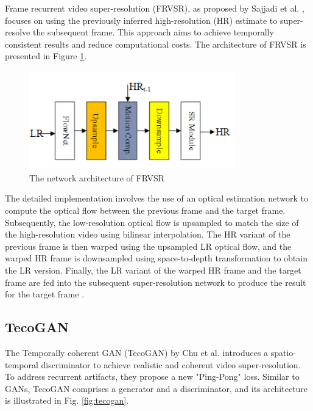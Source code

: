 \documentclass[conference]{IEEEtran}
\begin{document}
Frame recurrent video super-resolution (FRVSR), as proposed by Sajjadi et al. \cite{frvsr_2018}, focuses on using the previously inferred high-resolution (HR) estimate to super-resolve the subsequent frame. This approach aims to achieve temporally consistent results and reduce computational costs. The architecture of FRVSR is presented in Figure \ref{fig:frvsr_arch}.

\begin{figure}[t]
    \centering
    \centerline{\includegraphics[width=8.9cm]{frvsr_arch}}
    \caption{The network architecture of FRVSR \cite{video_super_resolution_survey_2020}}
    \label{fig:frvsr_arch}
\end{figure}

The detailed implementation involves the use of an optical estimation network to compute the optical flow between the previous frame and the target frame. Subsequently, the low-resolution optical flow is upsampled to match the size of the high-resolution video using bilinear interpolation. The HR variant of the previous frame is then warped using the upsampled LR optical flow, and the warped HR frame is downsampled using space-to-depth transformation to obtain the LR version. Finally, the LR variant of the warped HR frame and the target frame are fed into the subsequent super-resolution network to produce the result for the target frame \cite{video_super_resolution_survey_2020}.

\subsection{TecoGAN}

The Temporally coherent GAN (TecoGAN) by Chu et al. \cite{tecogan_2018} introduces a spatio-temporal discriminator to achieve realistic and coherent video super-resolution. To address recurrent artifacts, they propose a new "Ping-Pong" loss. Similar to GANs, TecoGAN comprises a generator and a discriminator, and its architecture is illustrated in Fig. \ref{fig:tecogan}.
\end{document}
